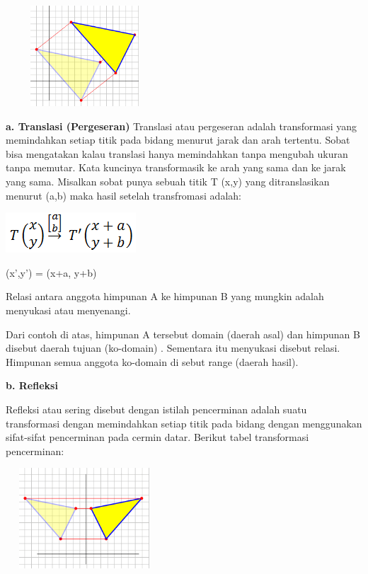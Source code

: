 \documentclass[11pt,fleqn]{book} %
\begin{document}
\noindent 
\begin{center}
	\noindent \includegraphics*[width=2.32in, height=1.48in, keepaspectratio=false, trim=0.00in 0.11in 0.00in 0.00in]{Pictures/2.PNG}
\end{center}
\noindent 
\noindent \textbf{a. Translasi (Pergeseran)}
\noindent 
Translasi atau pergeseran adalah transformasi yang memindahkan setiap titik pada bidang menurut jarak dan arah tertentu. Sobat bisa mengatakan kalau translasi hanya memindahkan tanpa mengubah ukuran tanpa memutar. Kata kuncinya transformasik ke arah yang sama dan ke jarak yang sama. Misalkan sobat punya sebuah titik T (x,y)  yang ditranslasikan menurut (a,b) maka hasil setelah transfromasi  adalah:

\noindent 
\begin{center}
\includegraphics{Pictures/3.PNG}\\
\end{center}

\noindent (x’,y’) = (x+a, y+b)
\noindent 

\noindent Relasi antara anggota himpunan A ke himpunan B yang mungkin adalah menyukasi atau menyenangi.

\noindent Dari contoh di atas, himpunan A tersebut domain (daerah asal) dan himpunan B disebut daerah tujuan (ko-domain) . Sementara itu menyukasi disebut relasi. Himpunan semua anggota ko-domain di sebut range (daerah hasil).

\noindent 

\noindent \textbf{b. Refleksi}

\noindent 

Refleksi atau sering disebut dengan istilah pencerminan adalah suatu transformasi dengan memindahkan setiap titik pada bidang dengan menggunakan sifat-sifat pencerminan pada cermin datar. Berikut tabel transformasi pencerminan:


\begin{center}
	\noindent \includegraphics*[width=2.32in, height=1.48in, keepaspectratio=false, trim=0.00in 0.11in 0.00in 0.00in]{Pictures/4.PNG}
\end{center}
\end{document}
